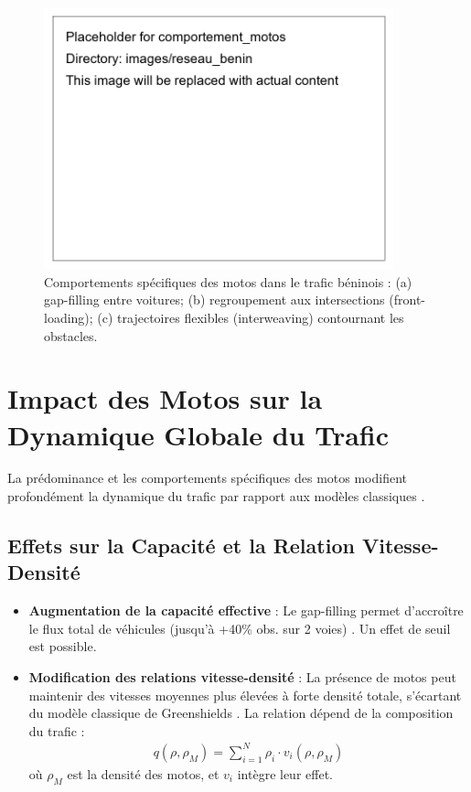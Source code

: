 \begin{figure}[htbp]
    \centering
    \includegraphics[width=0.9\textwidth]{images/reseau_benin/comportement_motos} %
    \caption{Comportements spécifiques des motos dans le trafic béninois : (a) gap-filling entre voitures; (b) regroupement aux intersections (front-loading); (c) trajectoires flexibles (interweaving) contournant les obstacles.} %
    \label{fig:comportement_motos} %
\end{figure}

\section{Impact des Motos sur la Dynamique Globale du Trafic}
\label{sec:impact_motos}

La prédominance et les comportements spécifiques des motos modifient profondément la dynamique du trafic par rapport aux modèles classiques \cite{wong2002multi, fan2013heterogeneous}.

\subsection{Effets sur la Capacité et la Relation Vitesse-Densité}
\label{subsec:effets_capacite_vitesse_densite}
\begin{itemize}
    \item \textbf{Augmentation de la capacité effective} : Le gap-filling permet d'accroître le flux total de véhicules (jusqu'à +40\% obs. sur 2 voies) \cite{chanut2005modeles}. Un effet de seuil est possible.
    \item \textbf{Modification des relations vitesse-densité} : La présence de motos peut maintenir des vitesses moyennes plus élevées à forte densité totale, s'écartant du modèle classique de Greenshields \cite{greenshields1935study}. La relation dépend de la composition du trafic :
      \begin{align}
      q(\rho, \rho_M) = \sum_{i=1}^N \rho_i \cdot v_i(\rho, \rho_M)
      \end{align}
      où $\rho_M$ est la densité des motos, et $v_i$ intègre leur effet.
\end{itemize}

